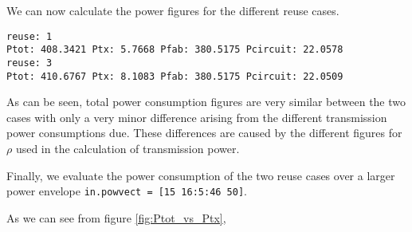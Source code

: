 \documentclass{article}
\begin{document}
We can now calculate the power figures for the different reuse cases.

\texttt{reuse: 1 \\
Ptot: 408.3421 Ptx: 5.7668 Pfab: 380.5175 Pcircuit: 22.0578 \\
reuse: 3 \\
Ptot: 410.6767 Ptx: 8.1083 Pfab: 380.5175 Pcircuit: 22.0509}

As can be seen, total power consumption figures are very similar between the two cases with only a very minor difference arising from the different transmission power consumptions due. These differences are caused by the different figures for \(\rho\) used in the calculation of transmission power.

Finally, we evaluate the power consumption of the two reuse cases over a larger power envelope \texttt{in.powvect = [15 16:5:46 50]}.

As we can see from figure \ref{fig:Ptot_vs_Ptx}, 
\end{document}
